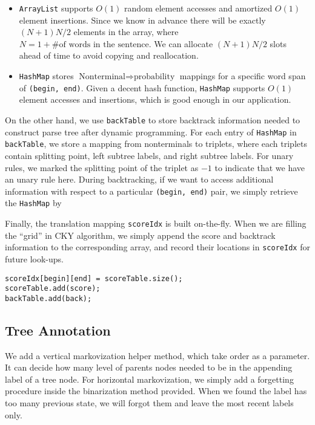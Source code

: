 \documentclass[letterpaper]{article}
\begin{document}
\begin{itemize}
\item \texttt{ArrayList} supports $O(1)$ random element accesses and amortized $O(1)$ element insertions. Since we know in advance there will be exactly $(N+1) N / 2$ elements in the array, where $N = 1 + \#\textrm{of words in the sentence}$. We can allocate $(N+1) N/2$ slots ahead of time
to avoid copying and reallocation.

\item \texttt{HashMap} stores $\textrm{Nonterminal} \Longrightarrow \textrm{probability}$ mappings for a specific word span of \texttt{(begin, end)}. Given a decent hash function, \texttt{HashMap} supports $O(1)$ element accesses and insertions, which is good enough in our application.
\end{itemize}

On the other hand, we use \texttt{backTable} to store backtrack information needed to construct parse tree after dynamic programming.
For each entry of \texttt{HashMap} in \texttt{backTable}, we store a mapping from nonterminals to triplets, where each triplets contain splitting point, left subtree labels, and right subtree labels.
For unary rules, we marked the splitting point of the triplet as $-1$ to indicate that we have an unary rule here.
During backtracking, if we want to access additional information with respect to a particular \texttt{(begin, end)} pair, we simply retrieve the \texttt{HashMap} by

\vspace{0.25cm}

Finally, the translation mapping \texttt{scoreIdx} is built on-the-fly.
When we are filling the ``grid'' in CKY algorithm, we simply append the score and backtrack information to the corresponding array, and record their locations in \texttt{scoreIdx} for future look-ups.

\begin{verbatim}
scoreIdx[begin][end] = scoreTable.size();
scoreTable.add(score);
backTable.add(back);
\end{verbatim}

\subsection{Tree Annotation}
We add a vertical markovization helper method, which take order as a parameter. It can decide how many level of parents nodes needed to be in the appending label of a tree node. 
For horizontal markovization, we simply add a forgetting procedure inside the binarization method provided. When we found the label has too many previous state, we will forgot them and leave the most recent labels only.
\end{document}
